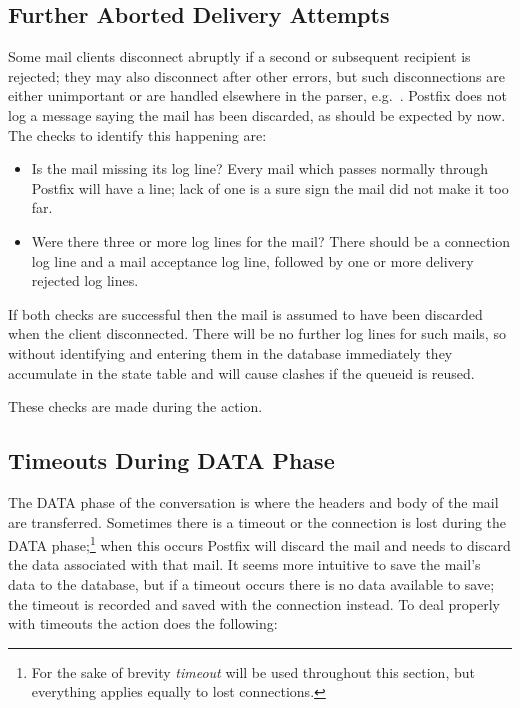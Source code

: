 \subsection{Further Aborted Delivery Attempts}

Some mail clients disconnect abruptly if a second or subsequent recipient
is rejected; they may also disconnect after other errors, but such
disconnections are either unimportant or are handled elsewhere in the
parser, e.g.\ .  Postfix does not
log a message saying the mail has been discarded, as should be expected by
now.  The checks to identify this happening are:

\begin{itemize}

    \item Is the mail missing its  log line?  Every mail
        which passes normally through Postfix will have a 
        line; lack of one is a sure sign the mail did not make it too far.

    \item Were there three or more  log lines for the mail?
        There should be a connection log line and a mail acceptance log
        line, followed by one or more delivery rejected log lines.

\end{itemize}

If both checks are successful then the mail is assumed to have been
discarded when the client disconnected.  There will be no further log lines
for such mails, so without identifying and entering them in the database
immediately they accumulate in the state table and will cause clashes if
the queueid is reused.

These checks are made during the  action.

\subsection{Timeouts During DATA Phase}

\label{timeouts during data phase}

The DATA phase of the  conversation is where the headers and
body of the mail are transferred.  Sometimes there is a timeout or the
connection is lost during the DATA phase;\footnote{For the sake of brevity
\textit{timeout\/} will be used throughout this section, but everything
applies equally to lost connections.} when this occurs Postfix will discard
the mail and \parsername{} needs to discard the data associated with that
mail.  It seems more intuitive to save the mail's data to the database, but
if a timeout occurs there is no data available to save; the timeout is
recorded and saved with the connection instead.  To deal properly with
timeouts the  action does the following:

